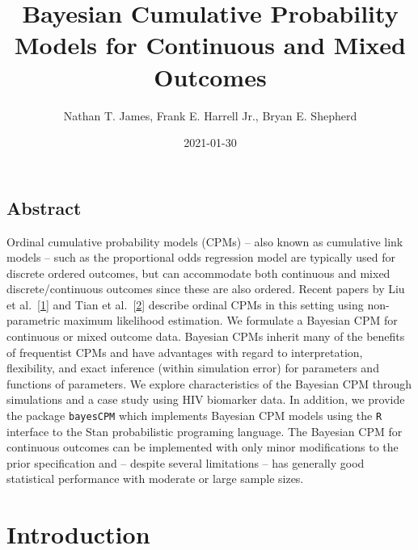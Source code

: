 \documentclass[
]{article}
\title{Bayesian Cumulative Probability Models for Continuous and Mixed Outcomes}
\author{Nathan T. James, Frank E. Harrell Jr., Bryan E. Shepherd}
\date{2021-01-30}
\begin{document}
\maketitle

\hypertarget{abstract}{%
\subsection{Abstract}\label{abstract}}

Ordinal cumulative probability models (CPMs) -- also known as cumulative link models -- such as the proportional odds regression model are typically used for discrete ordered outcomes, but can accommodate both continuous and mixed discrete/continuous outcomes since these are also ordered. Recent papers by Liu et al.~{{[}\protect\hyperlink{ref-liu_modeling_2017}{1}{]}} and Tian et al.~{{[}\protect\hyperlink{ref-tian_empirical_2019}{2}{]}} describe ordinal CPMs in this setting using non-parametric maximum likelihood estimation. We formulate a Bayesian CPM for continuous or mixed outcome data. Bayesian CPMs inherit many of the benefits of frequentist CPMs and have advantages with regard to interpretation, flexibility, and exact inference (within simulation error) for parameters and functions of parameters. We explore characteristics of the Bayesian CPM through simulations and a case study using HIV biomarker data. In addition, we provide the package \texttt{bayesCPM} which implements Bayesian CPM models using the \texttt{R} interface to the Stan probabilistic programing language. The Bayesian CPM for continuous outcomes can be implemented with only minor modifications to the prior specification and -- despite several limitations -- has generally good statistical performance with moderate or large sample sizes.

\hypertarget{introduction}{%
\section{Introduction}\label{introduction}}
\end{document}
